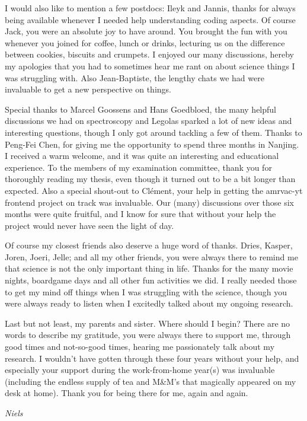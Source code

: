 I would also like to mention a few postdocs: Ileyk and Jannis, thanks for always being available whenever I needed help understanding coding aspects. Of course Jack, you were an absolute joy to have around. You brought the fun with you whenever you joined for coffee, lunch or drinks, lecturing us on the difference between cookies, biscuits and crumpets.
I enjoyed our many discussions, hereby my apologies that you had to sometimes hear me rant on about science things I was struggling with. Also Jean-Baptiste, the lengthy chats we had were invaluable to get a new perspective on things.

Special thanks to Marcel Goossens and Hans Goedbloed, the many helpful discussions we had on spectroscopy and Legolas sparked a lot of new ideas and interesting questions, though I only got around tackling a few of them. Thanks to Peng-Fei Chen, for giving me the opportunity to spend three months in Nanjing. I received a warm welcome, and it was quite an interesting and educational experience. To the members of my examination committee, thank you for thoroughly reading my thesis, even though it turned out to be a bit longer than expected. Also a special shout-out to Clément, your help in getting the amrvac-yt frontend project on track was invaluable. Our (many) discussions over those six months were quite fruitful, and I know for sure that without your help the project would never have seen the light of day.

Of course my closest friends also deserve a huge word of thanks. Dries, Kasper, Joren, Joeri, Jelle; and all my other friends, you were always there to remind me that science is not the only important thing in life. Thanks for the many movie nights, boardgame days and all other fun activities we did. I really needed those to get my mind off things when I was struggling with the science, though you were always ready to listen when I excitedly talked about my ongoing research.

Last but not least, my parents and sister. Where should I begin? There are no words to describe my gratitude, you were always there to support me, through good times and not-so-good times, hearing me passionately talk about my research. I wouldn't have gotten through these four years without your help, and especially your support during the work-from-home year(s) was invaluable (including the endless supply of tea and M\&M's that magically appeared on my desk at home). Thank you for being there for me, again and again.
\begin{flushright}
  \emph{Niels}
\end{flushright}



\cleardoublepage
